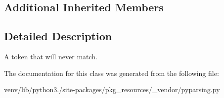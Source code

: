 \subsection*{Additional Inherited Members}


\subsection{Detailed Description}
\begin{DoxyVerb}A token that will never match.
\end{DoxyVerb}
 

The documentation for this class was generated from the following file\+:\begin{DoxyCompactItemize}
\item 
venv/lib/python3./site-\/packages/pkg\+\_\+resources/\+\_\+vendor/pyparsing.\+py\end{DoxyCompactItemize}
